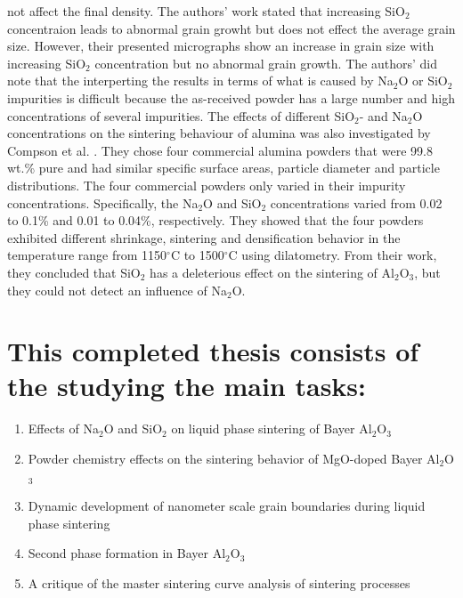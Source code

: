 not affect the final density. The authors' work stated that increasing SiO$_{2}$ concentraion leads to abnormal grain growht but does not effect the average grain size. However, their presented micrographs show an increase in grain size with increasing SiO$_{2}$ concentration but no abnormal grain growth. The authors' did note that the interperting the results in terms of what is caused by Na$_{2}$O or SiO$_{2}$ impurities is difficult because the as-received powder has a large number and high concentrations of several impurities. The effects of different SiO$_{2}$- and Na$_{2}$O concentrations on the sintering behaviour of alumina was also investigated by Compson et al. \cite{Compson2013}. They chose four commercial alumina powders that were 99.8 wt.\% pure and had similar specific surface areas, particle diameter and particle distributions. The four commercial powders only varied in their impurity concentrations. Specifically, the Na$_{2}$O and SiO$_{2}$ concentrations varied from 0.02 to 0.1\% and 0.01 to 0.04\%, respectively. They showed that the four powders exhibited different shrinkage, sintering and densification behavior in the temperature range from 1150$^{\circ}$C to 1500$^{\circ}$C using dilatometry. From their work, they concluded that SiO$_{2}$ has a deleterious effect on the sintering of Al$_{2}$O$_{3}$, but they could not detect an influence of Na$_{2}$O.

\pagebreak
\section*{This completed thesis consists of the studying the main tasks:}

\begin{enumerate}
	\item Effects of Na$_{2}$O and SiO$_{2}$ on liquid phase sintering of Bayer Al$_{2}$O$_{3}$
	\item Powder chemistry effects on the sintering behavior of MgO-doped Bayer Al$_{2}$O$_{3}$
	\item Dynamic development of nanometer scale grain boundaries during liquid phase sintering
	\item Second phase formation in Bayer Al$_{2}$O$_{3}$
	\item A critique of the master sintering curve analysis of sintering processes 
\end{enumerate}

